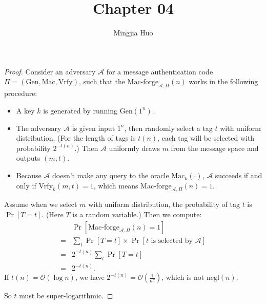 \documentclass[12pt]{article}
\newcommand{\negl}{\text{negl}}
\newcommand{\Gen}{\text{Gen}}
\newcommand{\Mac}{\text{Mac}}
\newcommand{\Vrfy}{\text{Vrfy}}
\newcommand{\A}{\mathcal{A}}
\newenvironment{problem}[2][Problem]{\begin{trivlist}
\item[\hskip \labelsep {\bfseries #1}\hskip \labelsep {\bfseries #2.}]}{\end{trivlist}}
\begin{document}
 
\title{Chapter 04}
\author{Mingjia Huo}
\maketitle

\begin{problem}{4.1}
\begin{proof}
Consider an adversary $\A$ for a message authentication code $\Pi=(\Gen,\Mac,\Vrfy)$, such that the $\text{Mac-forge}_{\A,\Pi}(n)$ works in the following procedure:
\begin{itemize}
    \item A key $k$ is generated by running $\Gen(1^n)$.
    \item The adversary $\A$ is given input $1^n$, then randomly select a tag $t$ with uniform distribution. (For the length of tags is $t(n)$, each tag will be selected with probability $2^{-t(n)}$.) Then $\A$ uniformly draws $m$ from the message space and outputs $(m,t)$.
    \item Because $\A$ doesn't make any query to the oracle $\Mac_k(\cdot)$, $\A$ succeeds if and only if $\Vrfy_k
(m,t)=1$, which means $\text{Mac-forge}_{\A,\Pi}(n)=1$. 
\end{itemize}
Assume when we select $m$ with uniform distribution, the probability of tag $t$ is $\Pr[T=t]$. (Here $T$ is a random variable.) Then we compute:
\begin{align*}
    &\Pr[\text{Mac-forge}_{\A,\Pi}(n)=1]\\
    =&\sum_{t}\Pr[T=t]\times\Pr[t\text{ is selected by }\A]\\
    =&2^{-t(n)}\sum_t\Pr[T=t]\\
    =&2^{-t(n)}.
\end{align*}
If $t(n)=\mathcal{O}(\log n)$, we have $2^{-t(n)}=\mathcal{O}(\frac{1}{n^d})$, which is not $\negl(n)$. \par
So $t$ must be super-logarithmic.
\end{proof}
\end{problem}
\end{document}
